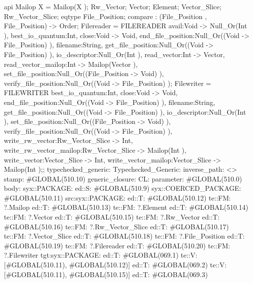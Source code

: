 api {
    Mailop X = Mailop(X );
    Rw_Vector;
    Vector;
    Element;
    Vector_Slice;
    Rw_Vector_Slice;
    eqtype File_Position;
    compare : (File_Position , File_Position) -> Order;
        Filereader
        = FILEREADER        {avail:Void -> Null_Or(Int ), best_io_quantum:Int, close:Void -> Void,
                            end_file_position:Null_Or((Void -> File_Position) ), filename:String,
                            get_file_position:Null_Or((Void -> File_Position) ), io_descriptor:Null_Or(Int ),
                            read_vector:Int -> Vector, read_vector_mailop:Int -> Mailop(Vector ),
                            set_file_position:Null_Or((File_Position -> Void) ),
                            verify_file_position:Null_Or((Void -> File_Position) )};
        Filewriter
        = FILEWRITER
                {best_io_quantum:Int, close:Void -> Void, end_file_position:Null_Or((Void -> File_Position) ),
                filename:String, get_file_position:Null_Or((Void -> File_Position) ), io_descriptor:Null_Or(Int ),
                set_file_position:Null_Or((File_Position -> Void) ),
                verify_file_position:Null_Or((Void -> File_Position) ), write_rw_vector:Rw_Vector_Slice -> Int,
                write_rw_vector_mailop:Rw_Vector_Slice -> Mailop(Int ), write_vector:Vector_Slice -> Int,
                write_vector_mailop:Vector_Slice -> Mailop(Int )};};
typechecked_generic:
Typechecked_Generic:
inverse_path: <>
stamp: #GLOBAL(510.10)
generic_closure:
CL:
parameter: #GLOBAL(510.0)
body: syx::PACKAGE:
        ed::S: #GLOBAL(510.9)
            syx::COERCED_PACKAGE:
                #GLOBAL(510.11)
                 src:syx::PACKAGE:
                        ed::T: #GLOBAL(510.12) te::FM: ?.Mailop
                        ed::T: #GLOBAL(510.13) te::FM: ?.Element
                        ed::T: #GLOBAL(510.14) te::FM: ?.Vector
                        ed::T: #GLOBAL(510.15) te::FM: ?.Rw_Vector
                        ed::T: #GLOBAL(510.16) te::FM: ?.Rw_Vector_Slice
                        ed::T: #GLOBAL(510.17) te::FM: ?.Vector_Slice
                        ed::T: #GLOBAL(510.18) te::FM: ?.File_Position
                        ed::T: #GLOBAL(510.19) te::FM: ?.Filereader
                        ed::T: #GLOBAL(510.20) te::FM: ?.Filewriter
                tgt:syx::PACKAGE:
                    ed::T: #GLOBAL(069.1)
                     te::V:
                     [#GLOBAL(510.11), #GLOBAL(510.12)]
                    ed::T: #GLOBAL(069.2)
                     te::V:
                     [#GLOBAL(510.11), #GLOBAL(510.15)]
                    ed::T: #GLOBAL(069.3)

